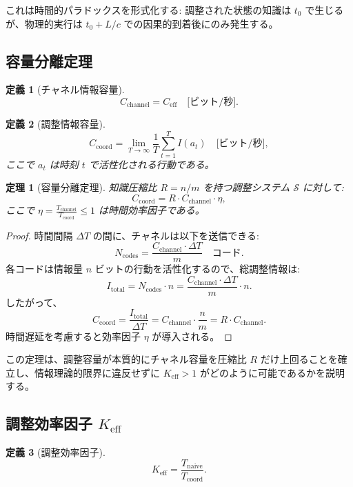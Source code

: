 \documentclass[11pt,a4paper]{article}
\newtheorem{theorem}{定理}
\newtheorem{definition}{定義}
\begin{document}
	これは時間的パラドックスを形式化する: 調整された状態の知識は $t_0$ で生じるが、物理的実行は $t_0 + L/c$ での因果的到着後にのみ発生する。
	
	\subsection{容量分離定理}
	
	\begin{definition}[チャネル情報容量]
		\[
		C_{\text{channel}} = C_{\text{eff}} \quad \text{[ビット/秒]}.
		\]
	\end{definition}
	
	\begin{definition}[調整情報容量]
		\[
		C_{\text{coord}} = \lim_{T \to \infty} \frac{1}{T} \sum_{t=1}^{T} I(a_t) \quad \text{[ビット/秒]},
		\]
		ここで $a_t$ は時刻 $t$ で活性化される行動である。
	\end{definition}
	
	\begin{theorem}[容量分離定理]
		\label{thm:capacity-separation}
		知識圧縮比 $R = n/m$ を持つ調整システム $\mathcal{S}$ に対して:
		\[
		C_{\text{coord}} = R \cdot C_{\text{channel}} \cdot \eta,
		\]
		ここで $\eta = \frac{T_{\text{channel}}}{T_{\text{coord}}} \leq 1$ は時間効率因子である。
	\end{theorem}
	
	\begin{proof}
		時間間隔 $\Delta T$ の間に、チャネルは以下を送信できる:
		\[
		N_{\text{codes}} = \frac{C_{\text{channel}} \cdot \Delta T}{m} \quad \text{コード}.
		\]
		各コードは情報量 $n$ ビットの行動を活性化するので、総調整情報は:
		\[
		I_{\text{total}} = N_{\text{codes}} \cdot n = \frac{C_{\text{channel}} \cdot \Delta T}{m} \cdot n.
		\]
		したがって、
		\[
		C_{\text{coord}} = \frac{I_{\text{total}}}{\Delta T} = C_{\text{channel}} \cdot \frac{n}{m} = R \cdot C_{\text{channel}}.
		\]
		時間遅延を考慮すると効率因子 $\eta$ が導入される。
	\end{proof}
	
	この定理は、調整容量が本質的にチャネル容量を圧縮比 $R$ だけ上回ることを確立し、情報理論的限界に違反せずに $K_{\mathrm{eff}} > 1$ がどのように可能であるかを説明する。
	
	\subsection{調整効率因子 $K_{\mathrm{eff}}$}
	
	\begin{definition}[調整効率因子]
		\[
		K_{\mathrm{eff}} = \frac{T_{\text{naive}}}{T_{\text{coord}}}.
		\]
	\end{definition}
	
\end{document}
